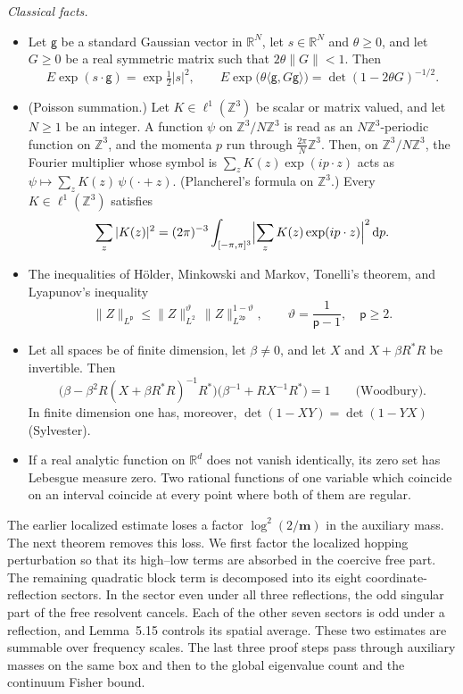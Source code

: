 \documentclass[11pt,letterpaper,reqno]{amsart}
\theoremstyle{definition}
\begin{document}
\emph{Classical facts.}
\begin{itemize}
\item[(K7)] Let $\mathsf g$ be a standard Gaussian vector in $\mathbb R^N$, let $s\in\mathbb R^N$ and $\theta\ge0$, and let $G\ge0$ be a real symmetric matrix such that $2\theta\|G\|<1$.
Then
\begin{equation*}
E\exp(s\cdot\mathsf g)=\exp\tfrac12|s|^2,\qquad E\exp\bigl(\theta\langle\mathsf g,G\mathsf g\rangle\bigr)=\det(1-2\theta G)^{-1/2}.
\end{equation*}
\item[(K8)] (Poisson summation.)
Let $K\in\ell^1(\mathbb Z^3)$ be scalar or matrix valued, and let $N\ge1$ be an integer.
A function $\psi$ on $\mathbb Z^3/N\mathbb Z^3$ is read as an $N\mathbb Z^3$-periodic function on $\mathbb Z^3$, and the momenta $p$ run through $\frac{2\pi}N\mathbb Z^3$.
Then, on $\mathbb Z^3/N\mathbb Z^3$, the Fourier multiplier whose symbol is $\sum_zK(z)\exp(ip\cdot z)$ acts as $\psi\mapsto\sum_zK(z)\,\psi(\cdot+z)$.
(Plancherel's formula on $\mathbb Z^3$.)
Every $K\in\ell^1(\mathbb Z^3)$ satisfies
\begin{equation*}
\sum_z|K(z)|^2=(2\pi)^{-3}\int_{[-\pi,\pi]^3}\Bigl|\sum_zK(z)\exp(ip\cdot z)\Bigr|^2\,\mathrm dp.
\end{equation*}
\item[(K9)] The inequalities of H\"older, Minkowski and Markov, Tonelli's theorem, and Lyapunov's inequality
\begin{equation*}
\|Z\|_{L^{\mathsf p}}\le\|Z\|_{L^2}^{\vartheta}\,\|Z\|_{L^{2\mathsf p}}^{1-\vartheta},\qquad\vartheta=\frac1{\mathsf p-1},\quad\mathsf p\ge2.
\end{equation*}
\item[(K10)] Let all spaces be of finite dimension, let $\beta\ne0$, and let $X$ and $X+\beta R^*R$ be invertible.
Then
\begin{equation*}
\bigl(\beta-\beta^2R(X+\beta R^*R)^{-1}R^*\bigr)\bigl(\beta^{-1}+RX^{-1}R^*\bigr)=1\qquad\text{(Woodbury)}.
\end{equation*}
In finite dimension one has, moreover, $\det(1-XY)=\det(1-YX)$ (Sylvester).
\item[(K11)] If a real analytic function on $\mathbb R^d$ does not vanish identically, its zero set has Lebesgue measure zero.
Two rational functions of one variable which coincide on an interval coincide at every point where both of them are regular.
\end{itemize}

The earlier localized estimate loses a factor $\log^2(2/\mathbf m)$
in the auxiliary mass. The next theorem removes this loss. We first
factor the localized hopping perturbation so that its high--low terms
are absorbed in the coercive free part. The remaining quadratic block
term is decomposed into its eight coordinate-reflection sectors.
In the sector even under all three reflections, the odd singular part
of the free resolvent cancels. Each of the other seven sectors is odd
under a reflection, and Lemma~5.15 controls its spatial average.
These two estimates are summable over frequency scales. The last
three proof steps pass through auxiliary masses on the same box and
then to the global eigenvalue count and the continuum Fisher bound.
\end{document}
